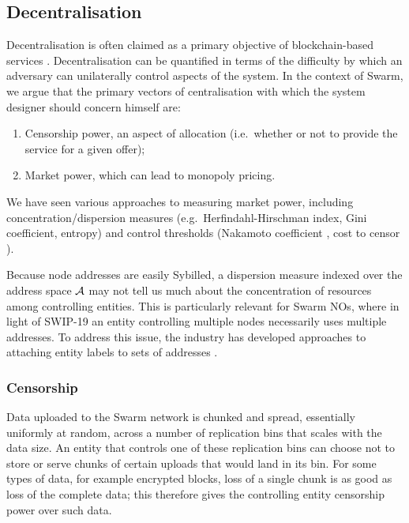 \subsection{Decentralisation}
\label{section:decentralization}

Decentralisation is often claimed as a primary objective of blockchain-based services \cite{srinivasan2017quantifying}.
%
Decentralisation can be quantified in terms of the difficulty by which an adversary can unilaterally control aspects of the system.
%
In the context of Swarm, we argue that the primary vectors of centralisation with which the system designer should concern himself are:
%
\begin{enumerate}
  \item Censorship power, an aspect of allocation (i.e.~whether or not to provide the service for a given offer);
  \item Market power, which can lead to monopoly pricing.
\end{enumerate}
%
We have seen various approaches to measuring market power, including concentration/dispersion measures (e.g.~Herfindahl-Hirschman index, Gini coefficient, entropy) and control thresholds (Nakamoto coefficient \cite{srinivasan2017quantifying}, cost to censor \cite{fox2023censorship}).

\begin{remark}

  Because node addresses are easily Sybilled, a dispersion measure indexed over the address space $\mathcal{A}$ may not tell us much about the concentration of resources among controlling entities.
  This is particularly relevant for Swarm NOs, where in light of SWIP-19 an entity controlling multiple nodes necessarily uses multiple addresses.
  To address this issue, the industry has developed approaches to attaching entity labels to sets of addresses \cite{victor2020address,arkham2024}.

\end{remark}

\subsubsection{Censorship}

Data uploaded to the Swarm network is chunked and spread, essentially uniformly at random, across a number of replication bins that scales with the data size.
%
An entity that controls one of these replication bins can choose not to store or serve chunks of certain uploads that would land in its bin.
%
For some types of data, for example encrypted blocks, loss of a single chunk is as good as loss of the complete data; this therefore gives the controlling entity censorship power over such data.

